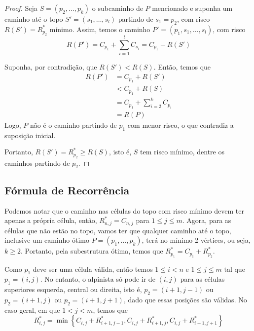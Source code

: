 \begin{proof}
    Seja $S = \left(p_2, \ldots, p_k\right)$ o subcaminho de $P$ mencionado e suponha um caminho até o topo $S' = \left(s_1, \ldots, s_l\right)$ partindo de $s_1 = p_2$, com risco $R(S') = R^*_{p_2}$ mínimo. Assim, temos o caminho $P' = \left(p_1, s_1, \ldots, s_l\right)$, com risco
    \[
        R(P') = C_{p_1} + \sum_{i = 1}^l C_{s_i} = C_{p_1} + R(S')
    \]

    Suponha, por contradição, que $R(S') < R(S)$. Então, temos que
    \begin{align*}
        R(P') &= C_{p_1} + R(S')  \\
            &< C_{p_1} + R(S) \\
            &= C_{p_1} + \sum_{i = 2}^{k} C_{p_i} \\
            &= R(P)
    \end{align*}
    Logo, $P$ não é o caminho partindo de $p_1$ com menor risco, o que contradiz a suposição inicial.

    Portanto, $R(S') = R^*_{p_2} \geq R(S)$, isto é, $S$ tem risco mínimo, dentre os caminhos partindo de $p_2$.
\end{proof}

\begin{samepage}
    \subsection{Fórmula de Recorrência} \label{sec:formrec}
\end{samepage}

Podemos notar que o caminho nas células do topo com risco mínimo devem ter apenas a própria célula, então, $R^*_{n, j} = C_{n, j}$  para $1 \leq j \leq m$. Agora, para as células que não estão no topo, vamos ter que qualquer caminho até o topo, inclusive um caminho ótimo $P = \left(p_1, \ldots, p_k\right)$, terá no mínimo 2 vértices, ou seja, $k \geq 2$. Portanto, pela subestrutura ótima, temos que $R^*_{p_1} = C_{p_1} + R^*_{p_2}$.

Como $p_1$ deve ser uma célula válida, então temos $1 \leq i < n$ e $1 \leq j \leq m$ tal que $p_1 = (i, j)$. No entanto, o alpinista só pode ir de $(i, j)$ para as células superiores esquerda, central ou direita, isto é, $p_2 = (i+1, j-1)$ ou $p_2 = (i+1, j)$ ou $p_2 = (i+1, j+1)$, dado que essas posições são válidas. No caso geral, em que $1 < j < m$, temos que
\[
    R^*_{i, j} = \min\left\{C_{i, j} + R^*_{i+1,j-1}, C_{i, j} + R^*_{i+1,j}, C_{i, j} + R^*_{i+1,j+1}\right\}
\]

